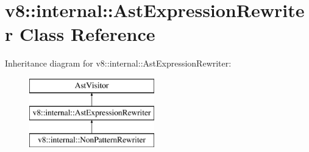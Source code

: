 \hypertarget{classv8_1_1internal_1_1_ast_expression_rewriter}{}\section{v8\+:\+:internal\+:\+:Ast\+Expression\+Rewriter Class Reference}
\label{classv8_1_1internal_1_1_ast_expression_rewriter}
Inheritance diagram for v8\+:\+:internal\+:\+:Ast\+Expression\+Rewriter\+:\begin{figure}[H]
\begin{center}
\leavevmode
\includegraphics[height=3.000000cm]{classv8_1_1internal_1_1_ast_expression_rewriter}
\end{center}
\end{figure}
